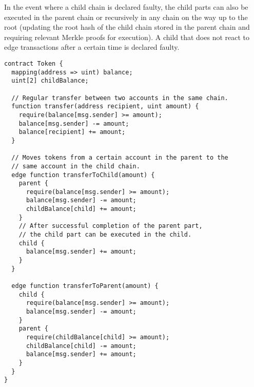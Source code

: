 \documentclass[letterpaper, 11pt]{article}
\begin{document}
In the event where a child chain is declared faulty, the child
parts can also be executed in the parent chain or recursively
in any chain on the way up to the root (updating the
root hash of the child chain stored in the parent chain and requiring
relevant Merkle proofs for execution). A child that does not react to
edge transactions after a certain time is declared faulty.

\begin{lstlisting}
contract Token {
  mapping(address => uint) balance;
  uint[2] childBalance;

  // Regular transfer between two accounts in the same chain.
  function transfer(address recipient, uint amount) {
    require(balance[msg.sender] >= amount);
    balance[msg.sender] -= amount;
    balance[recipient] += amount;
  }

  // Moves tokens from a certain account in the parent to the
  // same account in the child chain.
  edge function transferToChild(amount) {
    parent {
      require(balance[msg.sender] >= amount);
      balance[msg.sender] -= amount;
      childBalance[child] += amount;
    }
    // After successful completion of the parent part,
    // the child part can be executed in the child.
    child {
      balance[msg.sender] += amount;
    }
  }

  edge function transferToParent(amount) {
    child {
      require(balance[msg.sender] >= amount);
      balance[msg.sender] -= amount;
    }
    parent {
      require(childBalance[child] >= amount);
      childBalance[child] -= amount;
      balance[msg.sender] += amount;
    }
  }
}
\end{lstlisting}
\end{document}
